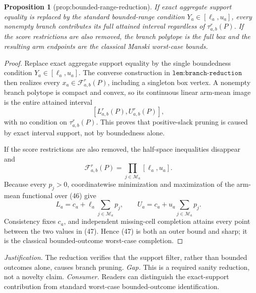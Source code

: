 \documentclass{article}
\newtheorem{proposition}{Proposition}
\begin{document}
\begin{proposition}[prop:bounded-range-reduction]\label{prop:bounded-range-reduction}
If exact aggregate support equality is replaced by the standard bounded-range condition \(Y_a\in[\ell_a,u_a]\), every nonempty branch contributes its full attained interval regardless of \(\tau_{a,b}^r(P)\). If the score restrictions are also removed, the branch polytope is the full box and the resulting arm endpoints are the classical Manski worst-case bounds.
\end{proposition}
\begin{proof}
Replace exact aggregate support equality by the single boundedness condition \(Y_a\in[\ell_a,u_a]\).  The converse construction in \(\texttt{lem:branch-reduction}\) then realizes every \(x_a\in\mathcal F_{a,b}^r(P)\), including a singleton box vertex.  A nonempty branch polytope is compact and convex, so its continuous linear arm-mean image is the entire attained interval
\[
 [L_{a,b}^r(P),U_{a,b}^r(P)],                                                  \tag{45}
\]
with no condition on \(\tau_{a,b}^r(P)\).  This proves that positive-slack pruning is caused by exact interval support, not by boundedness alone.

If the score restrictions are also removed, the half-space inequalities disappear and
\[
 \mathcal F_{a,b}^r(P)=\prod_{j\in\mathcal M_a}[\ell_a,u_a].                  \tag{46}
\]
Because every \(p_j>0\), coordinatewise minimization and maximization of the arm-mean functional over (46) give
\[
 L_a=c_a+\ell_a\sum_{j\in\mathcal M_a}p_j,
 \qquad
 U_a=c_a+u_a\sum_{j\in\mathcal M_a}p_j.                                     \tag{47}
\]
Consistency fixes \(c_a\), and independent missing-cell completion attains every point between the two values in (47).  Hence (47) is both an outer bound and sharp; it is the classical bounded-outcome worst-case completion.
\end{proof}
\par\smallskip\noindent \textit{Justification.} The reduction verifies that the support filter, rather than bounded outcomes alone, causes branch pruning. \textit{Gap.} This is a required sanity reduction, not a novelty claim. \textit{Consumer.} Readers can distinguish the exact-support contribution from standard worst-case bounded-outcome identification.
\end{document}
